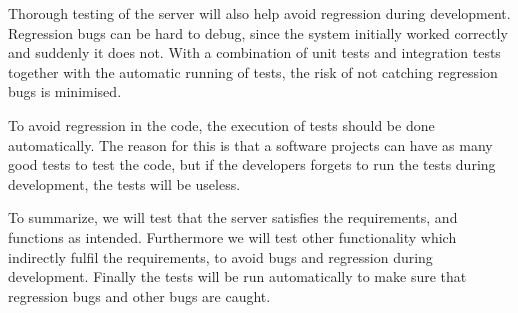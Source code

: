 
Thorough testing of the server will also help avoid regression during development.
Regression bugs can be hard to debug, since the system initially worked correctly and suddenly it does not.
With a combination of unit tests and integration tests together with the automatic running of tests,
the risk of not catching regression bugs is minimised\cite{regression}.

To avoid regression in the code, the execution of tests should be done automatically.
The reason for this is that a software projects can have as many good tests to test the code,
but if the developers forgets to run the tests during development,
the tests will be useless.

\bigskip
To summarize, we will test that the server satisfies the requirements,
and functions as intended.
Furthermore we will test other functionality which indirectly fulfil the requirements,
to avoid bugs and regression during development.
Finally the tests will be run automatically to make sure that regression bugs and other bugs are caught.
